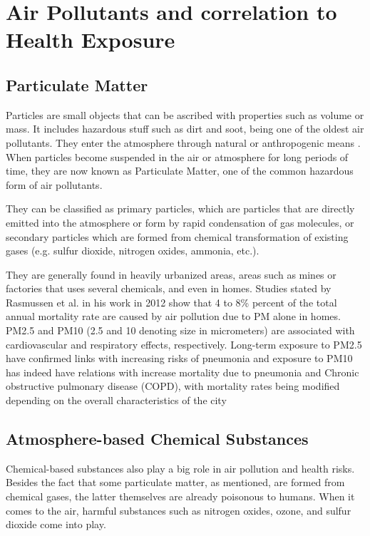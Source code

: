 \documentclass[10pt,11pt,12pt,oneside]{book}
\begin{document}
    \section{Air Pollutants and correlation to Health Exposure}
        \subsection{Particulate Matter}
        Particles are small objects that can be ascribed with properties such as volume or mass. It includes hazardous stuff such as dirt and soot, being one of the oldest air pollutants. They enter the atmosphere through natural or anthropogenic means \cite{knudsen2012particulate}. When particles become suspended in the air or atmosphere for long periods of time, they are now known as Particulate Matter, one of the common hazardous form of air pollutants.

        They can be classified as primary particles, which are particles that are directly emitted into the atmosphere or form by rapid condensation of gas molecules, or secondary particles which are formed from chemical transformation of existing gases (e.g. sulfur dioxide, nitrogen oxides, ammonia, etc.). \cite{finlayson2000chemistry}

        They are generally found in heavily urbanized areas, areas such as mines or factories that uses several chemicals, and even in homes. Studies stated by Rasmussen et al. in his work in 2012 show that 4 to 8\% percent of the total annual mortality rate are caused by air pollution due to PM alone in homes. PM2.5 and PM10 (2.5 and 10 denoting size in micrometers) are associated with cardiovascular and respiratory effects, respectively. Long-term exposure to PM2.5 have confirmed links with increasing risks of pneumonia \cite{Neupane2010} and exposure to PM10 has indeed have relations with increase mortality due to pneumonia and Chronic obstructive pulmonary disease (COPD), with mortality rates being modified depending on the overall characteristics of the city \cite{MedinaRamn2006}
        \subsection{Atmosphere-based Chemical Substances}
        Chemical-based substances also play a big role in air pollution and health risks. Besides the fact that some particulate matter, as mentioned, are formed from chemical gases, the latter themselves are already poisonous to humans. When it comes to the air, harmful substances such as nitrogen oxides, ozone, and sulfur dioxide come into play.
\end{document}
